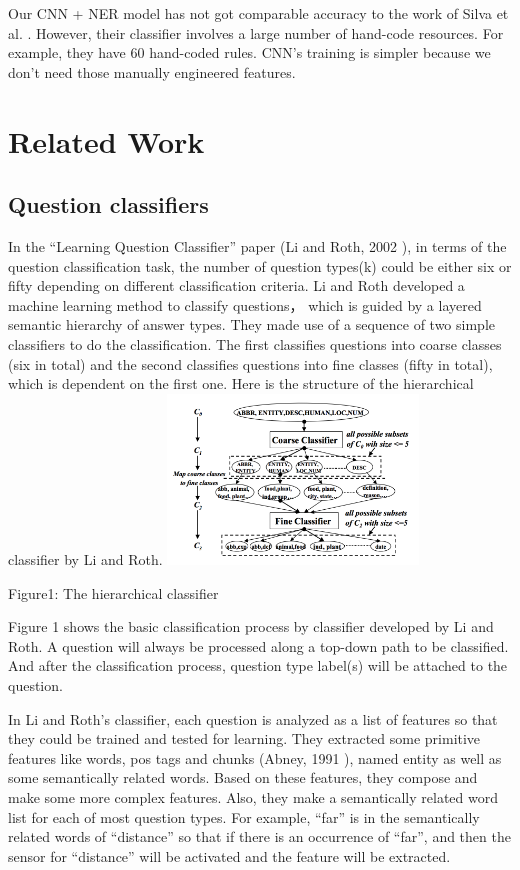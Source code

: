 \documentclass[10pt,twocolumn,letterpaper]{article}
\begin{document}
Our CNN + NER model has not got comparable accuracy to the work of Silva et al. \cite{silva2011symbolic}. However, their classifier involves a large number of hand-code resources. For example, they have 60 hand-coded rules. CNN's training is simpler because we don't need those manually engineered features. 

\section{Related Work}
\subsection{Question classifiers}
In the ``Learning Question Classifier'' paper (Li and Roth, 2002 \cite{li2002learning}), in terms of the question classification task, the number of question types(k) could be either six or fifty depending on different classification criteria.  Li and Roth developed a machine learning method to classify questions， which is guided by a layered semantic hierarchy of answer types. They made use of a sequence of two simple classifiers to do the classification. The first classifies questions into coarse classes (six in total) and the second classifies questions into fine classes (fifty in total), which is dependent on the first one. Here is the structure of the hierarchical classifier by Li and Roth.
\includegraphics[width=0.5\textwidth]{structure.png}
\begin{center}
Figure1:  The hierarchical classifier 
\end{center}
Figure 1 shows the basic classification process by classifier developed by Li and Roth. A question will always be processed along a top-down path to be classified. And after the classification process, question type label(s) will be attached to the question.

In Li and Roth's classifier, each question is analyzed as a list of features so that they could be trained and tested for learning. They extracted some primitive features like words, pos tags and chunks (Abney, 1991 \cite{berwick1991principle}), named entity as well as some semantically related words. Based on these features, they compose and make some more complex features. Also, they make a semantically related word list for each of most question types. For example, ``far'' is in the semantically related words of ``distance'' so that if there is an occurrence of ``far'', and then the sensor for ``distance'' will be activated and the feature will be extracted.
\end{document}
